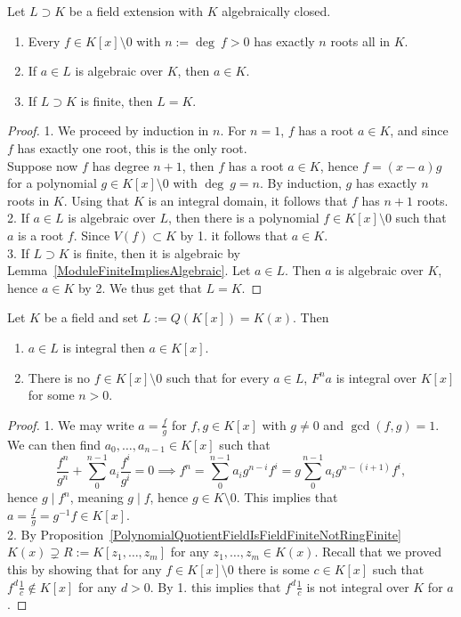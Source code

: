 \begin{lemma}\label{TechnicalLemmaAboutFieldExtOverAlgClosedFields}
    Let $L\supset K$ be a field extension with $K$ algebraically closed. 
    \begin{enumerate}
        \item Every $f\in K[x]\setminus 0$ with $n:=\deg \ f >0$ has exactly $n$ roots all in $K$.  
        \item If $a\in L$ is algebraic over $K$, then $a\in K$.
        \item If $L\supset K$ is finite, then $L=K$.
    \end{enumerate}
\end{lemma}
\begin{proof}
    1. We proceed by induction in $n$. For $n=1$, $f$ has a root $a\in K$, and since $f$ has exactly one root, this is the only root.\\ 
    Suppose now $f$ has degree $n+1$, then $f$ has a root $a\in K$, hence $f = (x-a)g$ for a polynomial $g\in K[x]\setminus0$ with $\deg \ g = n$. By induction, $g$ has exactly $n$ roots in $K$. Using that $K$ is an integral domain, it follows that $f$ has $n+1$ roots.\\
    2. If $a\in L$ is algebraic over $L$, then there is a polynomial $f\in K[x]\setminus 0$ such that $a$ is a root $f$. Since $V(f)\subset K$ by 1. it follows that $a\in K$.\\
    3. If $L\supset K$ is finite, then it is algebraic by Lemma~\ref{ModuleFiniteImpliesAlgebraic}. Let $a\in L$. Then $a$ is algebraic over $K$, hence $a\in K$ by 2. We thus get that $L=K$.
\end{proof}
\begin{lemma}\label{TechnicalPolynomialFieldExtensionLemma}
    Let $K$ be a field and set $L:= Q(K[x])=K(x)$. Then
    \begin{enumerate}
        \item $a\in L$ is integral then $a\in K[x]$.
        \item There is no $f\in K[x]\setminus 0$ such that for every $a\in L $, $F^na$ is integral over $K[x]$ for some $n>0$. 
    \end{enumerate}
\end{lemma}
\begin{proof}
    1. We may write $a = \frac{f}{g}$ for $f,g\in K[x]$ with $g\neq 0$ and $\gcd(f,g)=1$. We can then find $a_0,\dots,a_{n-1}\in K[x]$ such that 
    $$\frac{f^n}{g^n}+\sum_0^{n-1} a_i\frac{f^i}{g^i} = 0 \implies f^n = \sum_0^{n-1} a_ig^{n-i}f^i = g\sum_0^{n-1} a_ig^{n-(i+1)}f^i,$$
    hence $g\mid f^n$, meaning $g\mid f$, hence $g\in K\setminus 0$. This implies that $a = \frac{f}{g} = g^{-1}f\in K[x].$\\
    2. By Proposition~\ref{PolynomialQuotientFieldIsFieldFiniteNotRingFinite} $K(x)\supsetneq R:=K[z_1,\dots,z_m]$ for any $z_1,\dots,z_m\in K(x)$. Recall that we proved this by showing that for any $f\in K[x]\setminus 0$ there is some $c\in K[x]$ such that $f^d\frac{1}{c}\notin K[x]$ for any $d>0$. By 1. this implies that $f^d\frac{1}{c}$ is not integral over $K$ for $a$.
\end{proof}
